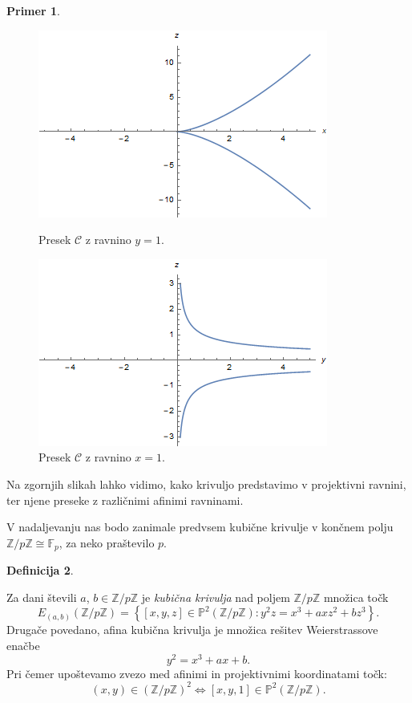 \documentclass[12pt,a4paper,twoside]{article}
\theoremstyle{definition} %
\newtheorem{definicija}{Definicija}[section]
\newtheorem{primer}[definicija]{Primer}
\theoremstyle{plain} %
\numberwithin{equation}{section}  %
\newcommand{\Z}{\mathbb Z}
\newcommand{\Fq}[1]{{\mathbb{F}_{#1}}}
\newcommand{\PP}{\mathbb P}
\begin{document}
\begin{primer}
\begin{figure}[t]
\centering
\begin{minipage}{.45\textwidth}
\centering
\includegraphics[scale=0.5]{images/projektivnay.png}
\caption[Presek algebraične krivulje z ravnino $y=1$.]{Presek $\mathcal{C}$ z ravnino $y=1$.}
\label{fig:projektivnay}
\end{minipage}%
\hfill
\begin{minipage}{.45\textwidth}
\centering
\includegraphics[scale=0.5]{images/projektivnax.png}
\caption[Presek algebraične krivulje z ravnino $x=1$.]{Presek $\mathcal{C}$ z ravnino $x=1$.}
\label{fig:projektivnax}
\end{minipage}
\end{figure}
Na zgornjih slikah lahko vidimo, kako krivuljo predstavimo v projektivni ravnini, ter njene preseke z različnimi afinimi ravninami.

\end{primer}



V nadaljevanju nas bodo zanimale predvsem kubične krivulje v končnem polju $\mathbb{Z}/p\mathbb{Z} \cong \Fq{p}$, za neko praštevilo $p$.

\begin{definicija}~

Za dani števili $a$, $b \in \mathbb{Z}/p\mathbb{Z}$ je \emph{kubična krivulja} nad poljem $\mathbb{Z}/p\mathbb{Z}$ množica točk
$$E_{(a,b)}(\mathbb{Z}/p\mathbb{Z}) =\left\{ [x,y,z] \in \PP^2(\mathbb{Z}/p\mathbb{Z}): y^2z=x^3+axz^2+bz^3 \right\} .$$
Drugače povedano, afina kubična krivulja je množica rešitev Weierstrassove enačbe
$$y^2=x^3+ax+b.$$
Pri čemer upoštevamo zvezo med afinimi in projektivnimi koordinatami točk:
$$(x,y)\in (\Z/p\Z)^2 \Leftrightarrow [x,y,1]\in \PP^2(\Z/p\Z).$$

\end{definicija}
\end{document}
